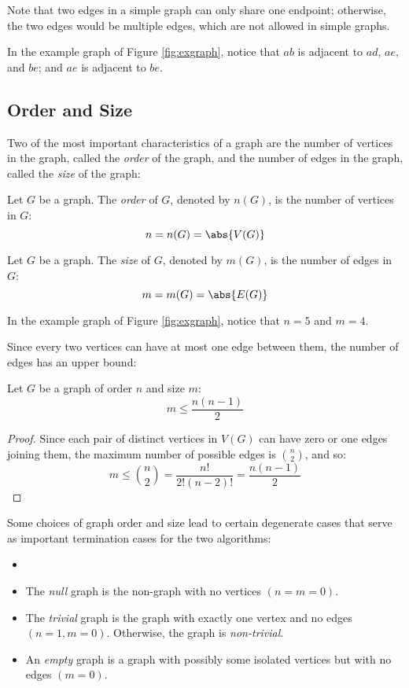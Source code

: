 Note that two edges in a simple graph can only share one endpoint; otherwise, the two edges would be multiple edges,
which are not allowed in simple graphs.

In the example graph of Figure \ref{fig:exgraph}, notice that \(ab\) is adjacent to \(ad\), \(ae\), and \(be\); and
\(ae\) is adjacent to \(be\).

\subsection{Order and Size}

Two of the most important characteristics of a graph are the number of vertices in the graph, called the \emph{order}
of the graph, and the number of edges in the graph, called the \emph{size} of the graph:

\begin{definition}[Order]
  Let \(G\) be a graph.  The \emph{order} of \(G\), denoted by \(n(G)\), is the number of vertices in \(G\):
  \[n=n(G)=\abs{V(G)}\]
\end{definition}

\begin{definition}[Size]
  Let \(G\) be a graph.  The \emph{size} of \(G\), denoted by \(m(G)\), is the number of edges in \(G\):
  \[m=m(G)=\abs{E(G)}\]
\end{definition}

In the example graph of Figure \ref{fig:exgraph}, notice that \(n=5\) and \(m=4\).

Since every two vertices can have at most one edge between them, the number of edges has an upper bound:

\begin{theorem}
  Let \(G\) be a graph of order \(n\) and size \(m\):
  \[m\le\frac{n(n-1)}{2}\]
\end{theorem}

\begin{proof}
  Since each pair of distinct vertices in \(V(G)\) can have zero or one edges joining them, the maximum number of
  possible edges is \(\binom{n}{2}\), and so:
  \[m\le\binom{n}{2}=\frac{n!}{2!(n-2)!}=\frac{n(n-1)}{2}\]
\end{proof}

Some choices of graph order and size lead to certain degenerate cases that serve as important termination cases for
the two algorithms:

\begin{definition}
  \begin{itemize}[left=0pt]
  \item[]
  \item The \emph{null} graph is the non-graph with no vertices \((n=m=0)\).
  \item The \emph{trivial} graph is the graph with exactly one vertex and no edges \((n=1,m=0)\).  Otherwise, the
    graph is \emph{non-trivial}.
    \item An \emph{empty} graph is a graph with possibly some isolated vertices but with no edges \((m=0)\).
  \end{itemize}
\end{definition}

